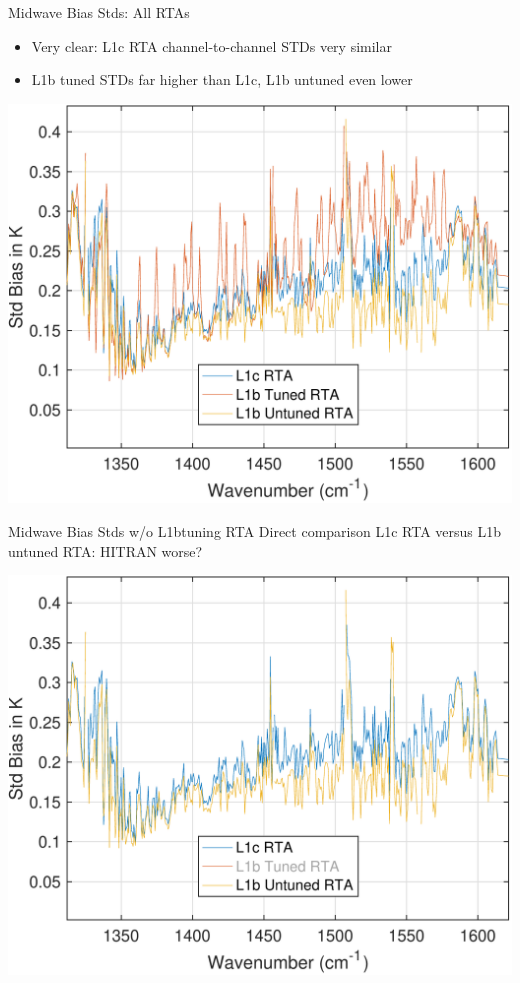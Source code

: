 \documentclass[10pt,t]{beamer}
\begin{document}
\begin{frame}[label={sec:orgfcad398}]{Midwave Bias Stds: All RTAs}
\begin{itemize}
\item Very clear: L1c RTA channel-to-channel STDs very similar
\item L1b tuned STDs far higher than L1c, L1b untuned even lower
\end{itemize}
\begin{center}
\includegraphics[width=0.65\linewidth]{./std_3rta_mw.pdf}
\end{center}
\end{frame}
\begin{frame}[label={sec:org6edc0cf}]{Midwave Bias Stds w/o L1btuning RTA}
Direct comparison L1c RTA versus L1b untuned RTA: HITRAN worse?
\begin{center}
\includegraphics[width=0.75\linewidth]{./std_3rta_mw_noL1btuning.pdf}
\end{center}
\end{frame}
\end{document}
